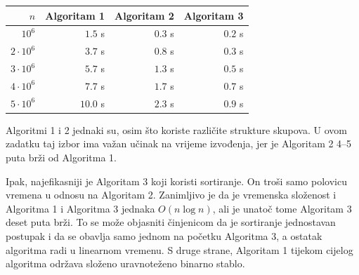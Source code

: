 \begin{center}
\begin{tabular}{rrrr}
$n$ & Algoritam 1 & Algoritam 2 & Algoritam 3 \\
\hline
$10^6$ & $1.5$ s & $0.3$ s & $0.2$ s \\
$2 \cdot 10^6$ & $3.7$ s & $0.8$ s & $0.3$ s \\
$3 \cdot 10^6$ & $5.7$ s & $1.3$ s & $0.5$ s \\
$4 \cdot 10^6$ & $7.7$ s & $1.7$ s & $0.7$ s \\
$5 \cdot 10^6$ & $10.0$ s & $2.3$ s & $0.9$ s \\
\end{tabular}
\end{center}

Algoritmi 1 i 2 jednaki su, osim što
koriste različite strukture skupova.
U ovom zadatku taj izbor ima važan učinak na
vrijeme izvođenja, jer je Algoritam 2
4–5 puta brži od Algoritma 1.

Ipak, najefikasniji je Algoritam 3
koji koristi sortiranje.
On troši samo polovicu vremena u odnosu na Algoritam 2.
Zanimljivo je da je vremenska složenost i
Algoritma 1 i Algoritma 3 jednaka $O(n \log n)$,
ali je unatoč tome Algoritam 3 deset puta brži.
To se može objasniti činjenicom da je
sortiranje jednostavan postupak i da se obavlja
samo jednom na početku Algoritma 3,
a ostatak algoritma radi u linearnom vremenu.
S druge strane,
Algoritam 1 tijekom cijelog algoritma održava
složeno uravnoteženo binarno stablo.
